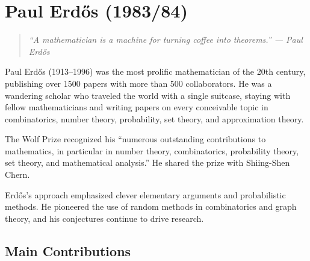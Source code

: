 \let\im\relax
\newcommand{\im}{\operatorname{im}}
\let\End\relax
\newcommand{\End}{\operatorname{End}}
\let\Ker\relax
\newcommand{\Ker}{\operatorname{Ker}}
\let\Aut\relax
\newcommand{\Aut}{\operatorname{Aut}}
\let\Hom\relax
\newcommand{\Hom}{\operatorname{Hom}}
\let\diam\relax
\newcommand{\diam}{\operatorname{diam}}
\let\N\relax
\newcommand{\N}{\mathbb{N}}
\let\R\relax
\newcommand{\R}{\mathbb{R}}
\let\C\relax
\newcommand{\C}{\mathbb{C}}
\let\Q\relax
\newcommand{\Q}{\mathbb{Q}}
\let\Z\relax
\newcommand{\Z}{\mathbb{Z}}

\chapter{Paul Erd\H{o}s (1983/84)}

\begin{quote}
\it ``A mathematician is a machine for turning coffee into theorems.'' --- Paul Erd\H{o}s
\end{quote}

Paul Erd\H{o}s (1913--1996) was the most prolific mathematician of the 20th century, publishing over 1500 papers with more than 500 collaborators. He was a wandering scholar who traveled the world with a single suitcase, staying with fellow mathematicians and writing papers on every conceivable topic in combinatorics, number theory, probability, set theory, and approximation theory.

The Wolf Prize recognized his ``numerous outstanding contributions to mathematics, in particular in number theory, combinatorics, probability theory, set theory, and mathematical analysis.'' He shared the prize with Shiing-Shen Chern.

Erd\H{o}s's approach emphasized clever elementary arguments and probabilistic methods. He pioneered the use of random methods in combinatorics and graph theory, and his conjectures continue to drive research.

\section{Main Contributions}

